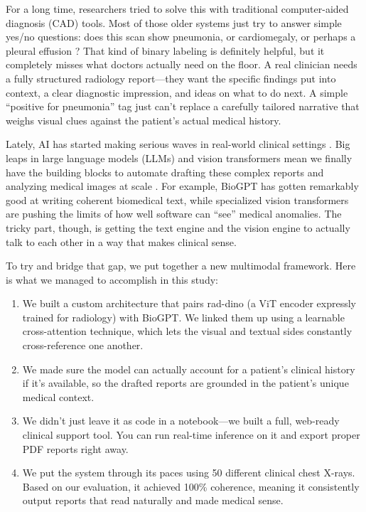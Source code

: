 \documentclass[conference]{IEEEtran}
\begin{document}
For a long time, researchers tried to solve this with traditional computer-aided diagnosis (CAD) tools. Most of those older systems just try to answer simple yes/no questions: does this scan show pneumonia, or cardiomegaly, or perhaps a pleural effusion \cite{rajpurkar2017chexnet}? That kind of binary labeling is definitely helpful, but it completely misses what doctors actually need on the floor. A real clinician needs a fully structured radiology report—they want the specific findings put into context, a clear diagnostic impression, and ideas on what to do next. A simple ``positive for pneumonia'' tag just can't replace a carefully tailored narrative that weighs visual clues against the patient's actual medical history.

Lately, AI has started making serious waves in real-world clinical settings \cite{esteva2019guide, topol2019high}. Big leaps in large language models (LLMs) and vision transformers mean we finally have the building blocks to automate drafting these complex reports and analyzing medical images at scale \cite{litjens2017survey, hosny2018artificial}. For example, BioGPT \cite{luo2022biogpt} has gotten remarkably good at writing coherent biomedical text, while specialized vision transformers \cite{dosovitskiy2020image} are pushing the limits of how well software can ``see'' medical anomalies. The tricky part, though, is getting the text engine and the vision engine to actually talk to each other in a way that makes clinical sense.

To try and bridge that gap, we put together a new multimodal framework. Here is what we managed to accomplish in this study:

\begin{enumerate}[leftmargin=*]
    \item We built a custom architecture that pairs rad-dino (a ViT encoder expressly trained for radiology) with BioGPT. We linked them up using a learnable cross-attention technique, which lets the visual and textual sides constantly cross-reference one another.
    \item We made sure the model can actually account for a patient's clinical history if it's available, so the drafted reports are grounded in the patient's unique medical context.
    \item We didn't just leave it as code in a notebook—we built a full, web-ready clinical support tool. You can run real-time inference on it and export proper PDF reports right away.
    \item We put the system through its paces using 50 different clinical chest X-rays. Based on our evaluation, it achieved 100\% coherence, meaning it consistently output reports that read naturally and made medical sense.
\end{enumerate}
\end{document}
